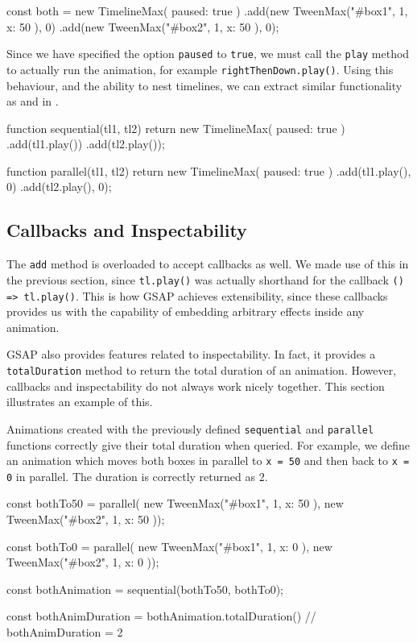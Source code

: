 \begin{js}
const both = new TimelineMax({ paused: true })
  .add(new TweenMax("#box1", 1, { x: 50 }), 0)
  .add(new TweenMax("#box2", 1, { x: 50 }), 0);
\end{js}

Since we have specified the option \texttt{paused} to \texttt{true}, we must call the \texttt{play} method to actually run the animation, for example \texttt{rightThenDown.play()}. Using this behaviour, and the ability to nest timelines, we can extract similar functionality as  and  in \dsl{}.

\begin{js}
function sequential(tl1, tl2) {
  return new TimelineMax({ paused: true })
    .add(tl1.play())
    .add(tl2.play());
}

function parallel(tl1, tl2) {
  return new TimelineMax({ paused: true })
    .add(tl1.play(), 0)
    .add(tl2.play(), 0);
}
\end{js}

\subsection{Callbacks and Inspectability}

The \texttt{add} method is overloaded to accept callbacks as well. We made use of this in the previous section, since \texttt{tl.play()} was actually shorthand for the callback \texttt{() => tl.play()}. This is how GSAP achieves extensibility, since these callbacks provides us with the capability of embedding arbitrary effects inside any animation.

GSAP also provides features related to inspectability. In fact, it provides a \texttt{totalDuration} method to return the total duration of an animation. However, callbacks and inspectability do not always work nicely together. This section illustrates an example of this.

Animations created with the previously defined \texttt{sequential} and \texttt{parallel} functions correctly give their total duration when queried. For example, we define an animation which moves both boxes in parallel to \texttt{x = 50} and then back to \texttt{x = 0} in parallel. The duration is correctly returned as 2.

\begin{js}
const bothTo50 = parallel(
  new TweenMax("#box1", 1, { x: 50 }),
  new TweenMax("#box2", 1, { x: 50 }));

const bothTo0 = parallel(
  new TweenMax("#box1", 1, { x: 0 }),
  new TweenMax("#box2", 1, { x: 0 }));

const bothAnimation = sequential(bothTo50, bothTo0);

const bothAnimDuration = bothAnimation.totalDuration()
// bothAnimDuration = 2
\end{js}

